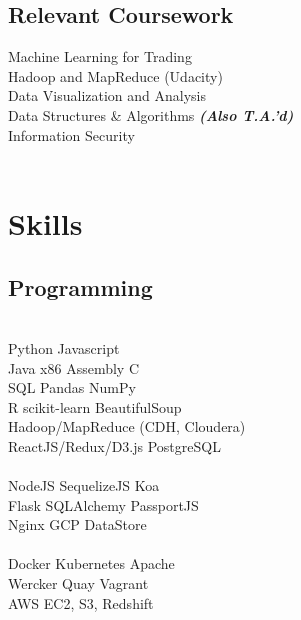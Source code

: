 \documentclass[]{deedy-resume-openfont}
\begin{document}
\begin{minipage}[t]{0.31\textwidth}
\subsection{Relevant Coursework}
Machine Learning for Trading \\
Hadoop and MapReduce (Udacity) \\
Data Visualization and Analysis \\
Data Structures \& Algorithms {\footnotesize \textit{\textbf{(Also T.A.'d) }}} \\
Information Security \\

\\[1\baselineskip]


\section{Skills}
\subsection{Programming}
\\[1\baselineskip]

Python \textbullet{} Javascript
\\[1\baselineskip]

 Java \textbullet{} x86 Assembly \textbullet{} C
\\[1\baselineskip]

SQL \textbullet{} Pandas \textbullet{} NumPy \\
R \textbullet{} scikit-learn \textbullet{} BeautifulSoup \\
Hadoop/MapReduce (CDH, Cloudera) \\
ReactJS/Redux/D3.js \textbullet{} PostgreSQL \\
\\[1\baselineskip]

NodeJS \textbullet{} SequelizeJS \textbullet{} Koa\\
Flask \textbullet{} SQLAlchemy \textbullet{} PassportJS\\
Nginx \textbullet{} GCP DataStore\\
\\[1\baselineskip]

Docker \textbullet{} Kubernetes \textbullet{} Apache \\
Wercker \textbullet{}  Quay \textbullet{} Vagrant \\
AWS EC2, S3, Redshift
\\[1\baselineskip]




\end{minipage}
\end{document}
